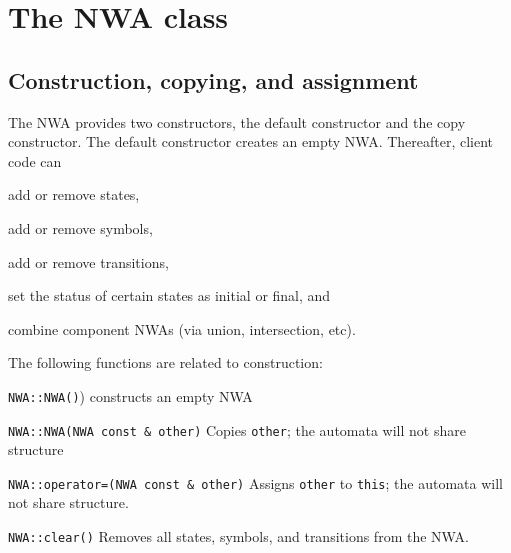 \section{The NWA class}

\subsection{Construction, copying, and assignment}
\label{Se:Construction}

The NWA provides two constructors, the default constructor and the copy
constructor. The default constructor creates an empty NWA. Thereafter, 
client code can \begin{inparaenum} \item add or remove states, \item add or remove
symbols, \item add or remove transitions, \item set the status of certain
  states as initial or final, and \item combine component NWAs (via union,
  intersection, etc). \end{inparaenum}


The following functions are related to construction:
\begin{description}
  \item \texttt{NWA::NWA()}) constructs an empty NWA

  \item \texttt{NWA::NWA(NWA const \& other)} Copies \texttt{other}; the
    automata will not share structure

  \item \texttt{NWA::operator=(NWA const \& other)} Assigns \texttt{other} to \texttt{this};
    the automata will not share structure.

  \item \texttt{NWA::clear()} \nopagebreak
    Removes all states, symbols, and transitions from the NWA.

\end{description}


